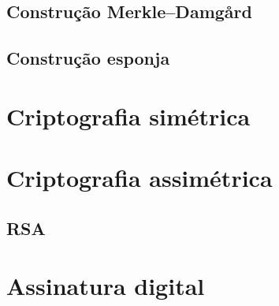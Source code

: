 \documentclass{ufsctex/ufsctex}
\begin{document}

\subsection{Construção Merkle--Damgård}

\subsection{Construção esponja}

\section{Criptografia simétrica}

\section{Criptografia assimétrica}

\subsection{RSA}

\section{Assinatura digital}



\end{document}
